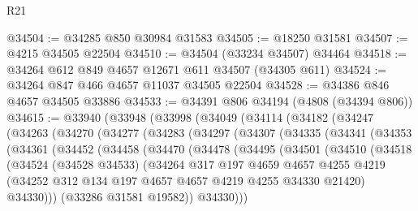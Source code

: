 \begin{lexlean}{R21}
\begin{coremodule}
@34504 := @34285 @850 @30984 @31583
@34505 := @18250 @31581
@34507 := @4215 @34505 @22504
@34510 := @34504 (@33234 @34507) @34464
@34518 := @34264 @612 @849 @4657 @12671 @611 @34507 (@34305 @611)
@34524 := @34264 @847 @466 @4657 @11037 @34505 @22504
@34528 := @34386 @846 @4657 @34505 @33886
@34533 := @34391 @806 @34194 (@4808 (@34394 @806))
@34615 := @33940
    (@33948
      (@33998
        (@34049
          (@34114
            (@34182
              (@34247
                (@34263
                  (@34270
                    (@34277
                      (@34283
                        (@34297
                          (@34307
                            (@34335
                              (@34341
                                (@34353
                                  (@34361
                                    (@34452
                                      (@34458
                                        (@34470
                                          (@34478
                                            (@34495
                                              (@34501
                                                (@34510
                                                  (@34518
                                                    (@34524
                                                      (@34528 @34533)
                                                      (@34264
                                                        @317
                                                        @197
                                                        @4659
                                                        @4657
                                                        @4255
                                                        @4219
                                                        (@34252
                                                          @312
                                                          @134
                                                          @197
                                                          @4657
                                                          @4657
                                                          @4219
                                                          @4255
                                                          @34330
                                                          @21420)
                                                        @34330)))
                                                  (@33286 @31581 @19582))
                                                @34330)))

\end{coremodule}
\end{lexlean}
